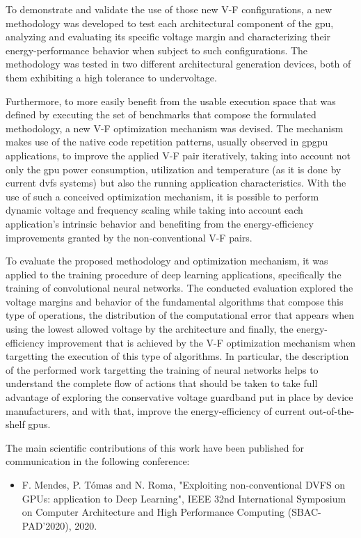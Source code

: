 To demonstrate and validate the use of those new V-F configurations, a new methodology was developed to test each architectural component of the \acrshort{gpu}, analyzing and evaluating its specific voltage margin and characterizing their energy-performance behavior when subject to such configurations. The methodology was tested in two different architectural generation devices, both of them exhibiting a high tolerance to undervoltage.

Furthermore, to more easily benefit from the usable execution space that was defined by executing the set of benchmarks that compose the formulated methodology, a new V-F optimization mechanism was devised. The mechanism makes use of the native code repetition patterns, usually observed in \acrshort{gpgpu} applications, to improve the applied V-F pair iteratively, taking into account not only the \acrshort{gpu} power consumption, utilization and temperature (as it is done by current \acrshort{dvfs} systems) but also the running application characteristics. With the use of such a conceived optimization mechanism, it is possible to perform dynamic voltage and frequency scaling while taking into account each application's intrinsic behavior and benefiting from the energy-efficiency improvements granted by the non-conventional V-F pairs.

To evaluate the proposed methodology and optimization mechanism, it was applied to the training procedure of deep learning applications, specifically the training of convolutional neural networks. The conducted evaluation explored the voltage margins and behavior of the fundamental algorithms that compose this type of operations, the distribution of the computational error that appears when using the lowest allowed voltage by the architecture and finally, the energy-efficiency improvement that is achieved by the V-F optimization mechanism when targetting the execution of this type of algorithms. In particular, the description of the performed work targetting the training of neural networks helps to understand the complete flow of actions that should be taken to take full advantage of exploring the conservative voltage guardband put in place by device manufacturers, and with that, improve the energy-efficiency of current out-of-the-shelf \acrshort{gpu}s.

The main scientiﬁc contributions of this work have been published for communication in the following conference:

\begin{itemize}
    \item F. Mendes, P. Tómas and N. Roma, "Exploiting non-conventional DVFS on GPUs: application to Deep Learning", IEEE 32nd International Symposium on Computer Architecture and High Performance Computing (SBAC-PAD'2020), 2020.
\end{itemize}


